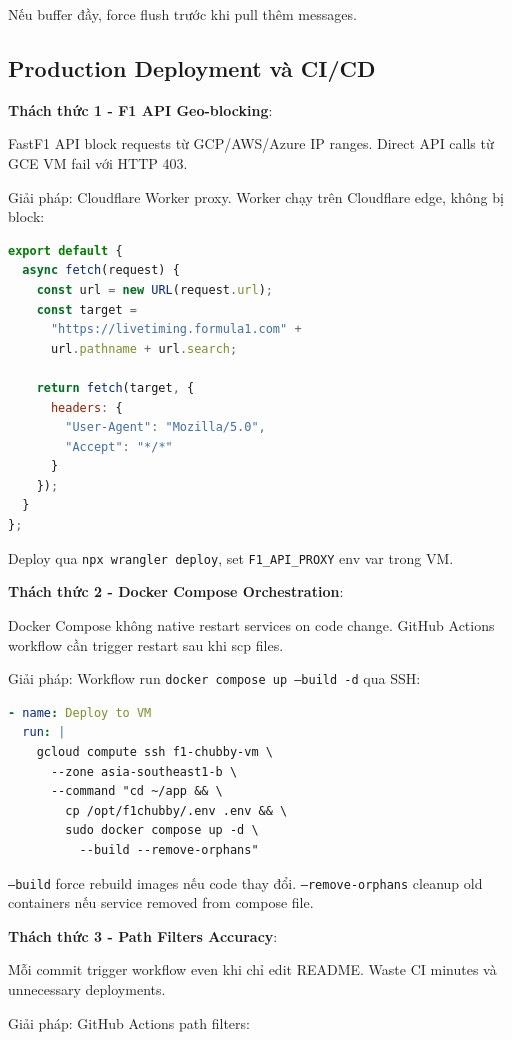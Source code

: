 \documentclass[conference,10pt]{IEEEtran}
\begin{document}
Nếu buffer đầy, force flush trước khi pull thêm messages.

\subsection{Production Deployment và CI/CD}

\textbf{Thách thức 1 - F1 API Geo-blocking}:

FastF1 API block requests từ GCP/AWS/Azure IP ranges. Direct API calls từ GCE VM fail với HTTP 403.

Giải pháp: Cloudflare Worker proxy. Worker chạy trên Cloudflare edge, không bị block:

\begin{lstlisting}[language=javascript]
export default {
  async fetch(request) {
    const url = new URL(request.url);
    const target =
      "https://livetiming.formula1.com" +
      url.pathname + url.search;

    return fetch(target, {
      headers: {
        "User-Agent": "Mozilla/5.0",
        "Accept": "*/*"
      }
    });
  }
};
\end{lstlisting}

Deploy qua \texttt{npx wrangler deploy}, set \texttt{F1\_API\_PROXY} env var trong VM.

\textbf{Thách thức 2 - Docker Compose Orchestration}:

Docker Compose không native restart services on code change. GitHub Actions workflow cần trigger restart sau khi scp files.

Giải pháp: Workflow run \texttt{docker compose up --build -d} qua SSH:

\begin{lstlisting}[language=yaml]
- name: Deploy to VM
  run: |
    gcloud compute ssh f1-chubby-vm \
      --zone asia-southeast1-b \
      --command "cd ~/app && \
        cp /opt/f1chubby/.env .env && \
        sudo docker compose up -d \
          --build --remove-orphans"
\end{lstlisting}

\texttt{--build} force rebuild images nếu code thay đổi. \texttt{--remove-orphans} cleanup old containers nếu service removed from compose file.

\textbf{Thách thức 3 - Path Filters Accuracy}:

Mỗi commit trigger workflow even khi chỉ edit README. Waste CI minutes và unnecessary deployments.

Giải pháp: GitHub Actions path filters:
\end{document}
